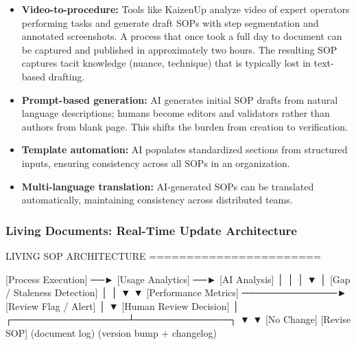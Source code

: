 \documentclass[11pt,letterpaper]{article}
\begin{document}
\begin{itemize}[leftmargin=1.5em]
  \item \textbf{Video-to-procedure:} Tools like KaizenUp analyze video of expert operators performing tasks and generate draft SOPs with step segmentation and annotated screenshots. A process that once took a full day to document can be captured and published in approximately two hours. The resulting SOP captures tacit knowledge (nuance, technique) that is typically lost in text-based drafting.
  \item \textbf{Prompt-based generation:} AI generates initial SOP drafts from natural language descriptions; humans become editors and validators rather than authors from blank page. This shifts the burden from creation to verification.
  \item \textbf{Template automation:} AI populates standardized sections from structured inputs, ensuring consistency across all SOPs in an organization.
  \item \textbf{Multi-language translation:} AI-generated SOPs can be translated automatically, maintaining consistency across distributed teams.
\end{itemize}

\subsubsection{Living Documents: Real-Time Update Architecture}

\begin{asciibox}
  LIVING SOP ARCHITECTURE
  =======================

  [Process Execution] ──► [Usage Analytics] ──► [AI Analysis]
          │                                           │
          │                                           ▼
          │                               [Gap / Staleness Detection]
          │                                           │
          ▼                                           ▼
  [Performance Metrics] ──────────────► [Review Flag / Alert]
                                                      │
                                                      ▼
                                          [Human Review Decision]
                                                      │
                                    ┌─────────────────┴──────────────┐
                                    ▼                                 ▼
                              [No Change]                      [Revise SOP]
                            (document log)               (version bump + changelog)
\end{asciibox}
\end{document}
